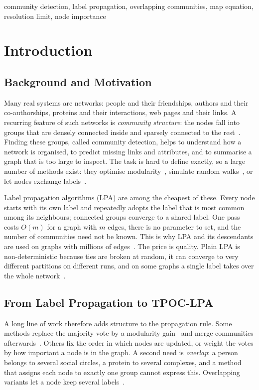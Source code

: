 \documentclass[conference]{IEEEtran}
\begin{document}
\begin{IEEEkeywords}
community detection, label propagation, overlapping communities, map equation, resolution limit, node importance
\end{IEEEkeywords}

\section{Introduction}\label{sec:intro}
\subsection{Background and Motivation}
Many real systems are networks: people and their friendships, authors and their co-authorships, proteins and their interactions, web pages and their links. A recurring feature of such networks is \emph{community structure}: the nodes fall into groups that are densely connected inside and sparsely connected to the rest~\cite{girvan2002,fortunato2010}. Finding these groups, called community detection, helps to understand how a network is organised, to predict missing links and attributes, and to summarise a graph that is too large to inspect. The task is hard to define exactly, so a large number of methods exist: they optimise modularity~\cite{newman2004}, simulate random walks~\cite{pons2006,rosvall2008}, or let nodes exchange labels~\cite{raghavan2007}.

Label propagation algorithms (LPA) are among the cheapest of these. Every node starts with its own label and repeatedly adopts the label that is most common among its neighbours; connected groups converge to a shared label. One pass costs $O(m)$ for a graph with $m$ edges, there is no parameter to set, and the number of communities need not be known. This is why LPA and its descendants are used on graphs with millions of edges~\cite{leung2009,traag2023}. The price is quality. Plain LPA is non-deterministic because ties are broken at random, it can converge to very different partitions on different runs, and on some graphs a single label takes over the whole network~\cite{raghavan2007}.

\subsection{From Label Propagation to TPOC-LPA}
A long line of work therefore adds structure to the propagation rule. Some methods replace the majority vote by a modularity gain~\cite{barber2009} and merge communities afterwards~\cite{liu2010}. Others fix the order in which nodes are updated, or weight the votes by how important a node is in the graph. A second need is \emph{overlap}: a person belongs to several social circles, a protein to several complexes, and a method that assigns each node to exactly one group cannot express this. Overlapping variants let a node keep several labels~\cite{gregory2010,xie2011}.
\end{document}
